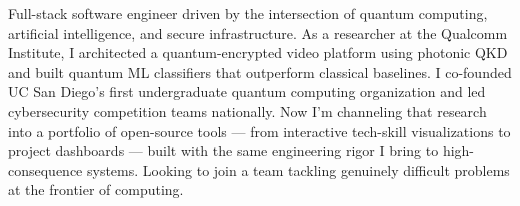 

\begin{cvparagraph}

Full-stack software engineer driven by the intersection of quantum computing, artificial intelligence, and secure infrastructure. As a researcher at the Qualcomm Institute, I architected a quantum-encrypted video platform using photonic QKD and built quantum ML classifiers that outperform classical baselines. I co-founded UC San Diego's first undergraduate quantum computing organization and led cybersecurity competition teams nationally. Now I'm channeling that research into a portfolio of open-source tools --- from interactive tech-skill visualizations to project dashboards --- built with the same engineering rigor I bring to high-consequence systems. Looking to join a team tackling genuinely difficult problems at the frontier of computing.
\end{cvparagraph}